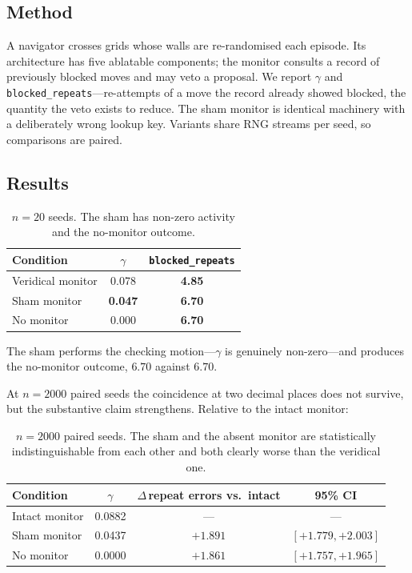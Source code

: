 \documentclass[11pt]{article}
\begin{document}
\subsection{Method}

A navigator crosses grids whose walls are re-randomised each episode. Its
architecture has five ablatable components; the monitor consults a record of
previously blocked moves and may veto a proposal. We report $\gamma$ and
\texttt{blocked\_repeats}---re-attempts of a move the record already showed
blocked, the quantity the veto exists to reduce. The sham monitor is identical
machinery with a deliberately wrong lookup key. Variants share RNG streams per
seed, so comparisons are paired.

\subsection{Results}

\begin{table}[h]
\centering
\begin{tabular}{lcc}
\toprule
Condition & $\gamma$ & \texttt{blocked\_repeats} \\
\midrule
Veridical monitor & 0.078 & \textbf{4.85} \\
Sham monitor & \textbf{0.047} & \textbf{6.70} \\
No monitor & 0.000 & \textbf{6.70} \\
\bottomrule
\end{tabular}
\caption{$n{=}20$ seeds. The sham has non-zero activity and the no-monitor
outcome.}
\end{table}

\noindent
The sham performs the checking motion---$\gamma$ is genuinely non-zero---and
produces the no-monitor outcome, $6.70$ against $6.70$.

At $n = 2000$ paired seeds the coincidence at two decimal places does not
survive, but the substantive claim strengthens. Relative to the intact monitor:

\begin{table}[h]
\centering
\begin{tabular}{lccc}
\toprule
Condition & $\gamma$ & $\Delta$\,repeat errors vs.\ intact & 95\% CI \\
\midrule
Intact monitor & 0.0882 & --- & --- \\
Sham monitor & 0.0437 & $+1.891$ & $[+1.779, +2.003]$ \\
No monitor & 0.0000 & $+1.861$ & $[+1.757, +1.965]$ \\
\bottomrule
\end{tabular}
\caption{$n = 2000$ paired seeds. The sham and the absent monitor are
statistically indistinguishable from each other and both clearly worse than
the veridical one.}
\end{table}
\end{document}
